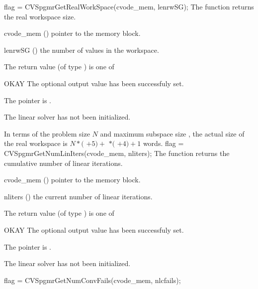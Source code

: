 {}
{
  flag = CVSpgmrGetRealWorkSpace(cvode\_mem, lenrwSG);
}
{
  The function  returns the
  {\cvspgmr} real workspace size.
}
{
  \begin{args}
  \item[cvode\_mem] ()
    pointer to the {\cvode} memory block.
  \item[lenrwSG] ()
    the number of  values in the {\cvspgmr} workspace.
  \end{args}
}
{
  The return value  (of type ) is one of
  \begin{args}
  \item[OKAY] 
    The optional output value has been successfuly set.
  \item[\Id{LIN\_NO\_MEM}]
    The  pointer is .
  \item[\Id{LIN\_NO\_LMEM}]
    The {\cvspgmr} linear solver has not been initialized.
  \end{args}
}
{
  In terms of the problem size $N$ and maximum subspace size , 
  the actual size of the real workspace is
  $N*($  $+ 5) +$  $*($  $ + 4) + 1$  words.
}
{
  flag = CVSpgmrGetNumLinIters(cvode\_mem, nliters);
}
{
  The function  returns the
  cumulative number of linear iterations.
}
{
  \begin{args}
  \item[cvode\_mem] ()
    pointer to the {\cvode} memory block.
  \item[nliters] ()
    the current number of linear iterations.
  \end{args}
}
{
  The return value  (of type ) is one of
  \begin{args}
  \item[OKAY] 
    The optional output value has been successfuly set.
  \item[\Id{LIN\_NO\_MEM}]
    The  pointer is .
  \item[\Id{LIN\_NO\_LMEM}]
    The {\cvspgmr} linear solver has not been initialized.
  \end{args}
}
{}
{
  flag = CVSpgmrGetNumConvFails(cvode\_mem, nlcfails);
}
